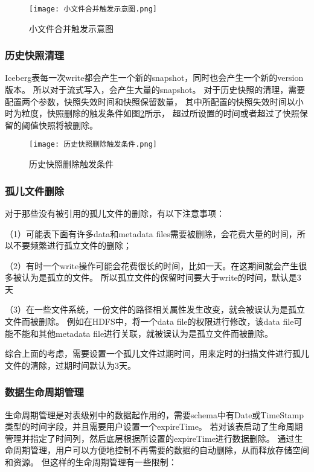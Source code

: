 \begin{figure}[H]
  \centering
  \texttt{[image: 小文件合并触发示意图.png]}
  \caption{小文件合并触发示意图}
  \label{fig:小文件合并触发示意图}
\end{figure}

\subsubsection{历史快照清理}

Iceberg表每一次write都会产生一个新的snapshot，同时也会产生一个新的version版本。
所以对于流式写入，会产生大量的snapshot。
对于历史快照的清理，需要配置两个参数，快照失效时间和快照保留数量，
其中所配置的快照失效时间以小时为粒度，快照删除的触发条件如图\ref{fig:历史快照删除触发条件}所示，
超过所设置的时间或者超过了快照保留的阈值快照将被删除。

\begin{figure}[H]
  \centering
  \texttt{[image: 历史快照删除触发条件.png]}
  \caption{历史快照删除触发条件}
  \label{fig:历史快照删除触发条件}
\end{figure}

\subsubsection{孤儿文件删除}

对于那些没有被引用的孤儿文件的删除，有以下注意事项：

（1）可能表下面有许多data和metadata files需要被删除，会花费大量的时间，所以不要频繁进行孤立文件的删除；

（2）有时一个write操作可能会花费很长的时间，比如一天。在这期间就会产生很多被认为是孤立的文件。
所以孤立文件的保留时间要大于write的时间，默认是3天

（3）在一些文件系统，一份文件的路径相关属性发生改变，就会被误认为是孤立文件而被删除。
例如在HDFS中，将一个data file的权限进行修改，该data file可能不能和其他metadata file进行关联，就被误认为是孤立文件而被删除。

综合上面的考虑，需要设置一个孤儿文件过期时间，用来定时的扫描文件进行孤儿文件的清除，过期时间默认为3天。

\subsubsection{数据生命周期管理}

⽣命周期管理是对表级别中的数据起作用的，需要schema中有Date或TimeStamp类型的时间字段，并且需要用户设置一个expireTime。
若对该表启动了⽣命周期管理并指定了时间列，然后底层根据所设置的expireTime进⾏数据删除。
通过生命周期管理，用户可以方便地控制不再需要的数据的自动删除，从而释放存储空间和资源。
但这样的⽣命周期管理有一些限制：

